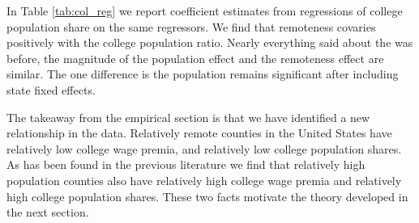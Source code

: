 \documentclass[12 pt]{article}
\begin{document}
In Table \ref{tab:col_reg} we report coefficient estimates from regressions of college population share on the same regressors.  We find that remoteness covaries positively with the college population ratio.  Nearly everything said about the was before, the magnitude of the population effect and the remoteness effect are similar.  The one difference is the population remains significant after including state fixed effects.

The takeaway from the empirical section is that we have identified a new relationship in the data.  Relatively remote counties in the United States have relatively low college wage premia, and relatively low college population shares.  As has been found in the previous literature we find that relatively high population counties also have relatively high college wage premia and relatively high college population shares.  These two facts motivate the theory developed in the next section.
\end{document}
